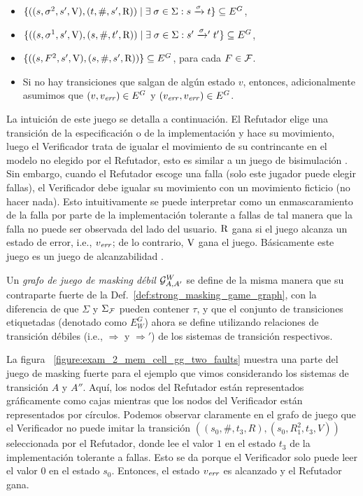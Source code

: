 \begin{definition}
\begin{itemize}
  \item $\{ ((s, \sigma^2, s', \mathrm{V}), (t, \#, s', \mathrm{R})) \mid \exists\;\sigma \in \Sigma: s \xrightarrow{\sigma} t \} \subseteq E^G$,

  \item $\{ ((s, \sigma^1, s', \mathrm{V}), (s, \#, t', \mathrm{R})) \mid \exists\;\sigma \in \Sigma: s' \mathrel{{\xrightarrow[]{\sigma}}{}'} t' \} \subseteq E^G$,

  \item $\{ ((s, F^2, s', \mathrm{V}), (s, \#, s', \mathrm{R})) \} \subseteq E^G$, para cada $F \in \mathcal{F}$. 

  \item Si no hay transiciones que salgan de algún estado $v$, entonces, adicionalmente asumimos que $(v, v_{\mathit{err}}) \in E^G$ y $(v_{\mathit{err}}, v_{\mathit{err}}) \in E^G$.
\end{itemize}

\end{definition}

La intuición de este juego se detalla a continuación. 
El Refutador elige una transición de la especificación o de la implementación y hace su movimiento, luego el Verificador trata de igualar el movimiento de su contrincante en el modelo no elegido por el Refutador, esto es similar a un juego de bisimulación \cite{Stirling99}. 
Sin embargo, cuando el Refutador escoge una falla (solo este jugador puede elegir fallas), el Verificador debe igualar su movimiento con un movimiento ficticio (no hacer nada).
Esto intuitivamente se puede interpretar como un enmascaramiento de la falla por parte de la implementación tolerante a fallas de tal manera que la falla no puede ser observada del lado del usuario. $\mathrm{R}$ gana si el juego alcanza un estado de error, i.e., $v_{\mathit{err}}$; de lo contrario, $\mathrm{V}$ gana el juego. 
Básicamente este juego es un juego de alcanzabilidad \cite{Jurd11}.

Un \emph{grafo de juego de masking débil} $\mathcal{G}^W_{A,A'}$ se define de la misma manera que su contraparte fuerte de la 
Def.~\ref{def:strong_masking_game_graph}, con la diferencia de que
$\Sigma$ y $\Sigma_{\mathcal{F}}$ pueden contener $\tau$, y que el conjunto de transiciones etiquetadas (denotado como $E_W^G$) ahora se define utilizando relaciones de transición débiles (i.e., $\Rightarrow$ y $\Rightarrow'$) de los sistemas de transición respectivos.

La figura ~\ref{figure:exam_2_mem_cell_gg_two_faults} muestra una parte del juego de masking fuerte para el ejemplo que vimos considerando los sistemas de transición $A$ y $A''$. Aquí, los nodos del Refutador están representados gráficamente como cajas mientras que los nodos del Verificador están representados por círculos.
Podemos observar claramente en el grafo de juego que el Verificador no puede imitar la transición $((s_0, \#, t_3, R),(s_0, R_1^2, t_3, V))$
seleccionada por el Refutador, donde lee el valor $1$ en el estado $t_3$ de la implementación tolerante a fallas. Esto se da porque el Verificador solo puede leer el valor $0$ en el estado $s_0$. 
Entonces, el estado $v_{\mathit{err}}$ es alcanzado y el Refutador gana.

